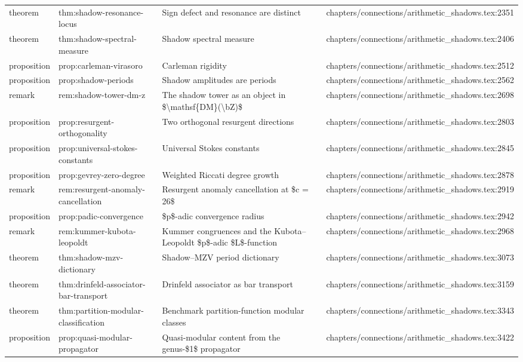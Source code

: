 \documentclass[11pt]{article}
\begin{document}
\begin{longtable}{L{0.10\textwidth}L{0.26\textwidth}L{0.42\textwidth}L{0.22\textwidth}}
theorem & thm:shadow-resonance-locus & Sign defect and resonance are distinct & chapters/connections/arithmetic\_shadows.tex:2351\\
theorem & thm:shadow-spectral-measure & Shadow spectral measure & chapters/connections/arithmetic\_shadows.tex:2406\\
proposition & prop:carleman-virasoro & Carleman rigidity & chapters/connections/arithmetic\_shadows.tex:2512\\
proposition & prop:shadow-periods & Shadow amplitudes are periods & chapters/connections/arithmetic\_shadows.tex:2562\\
remark & rem:shadow-tower-dm-z & The shadow tower as an object in \$\textbackslash{}mathsf\{DM\}(\textbackslash{}bZ)\$ & chapters/connections/arithmetic\_shadows.tex:2698\\
proposition & prop:resurgent-orthogonality & Two orthogonal resurgent directions & chapters/connections/arithmetic\_shadows.tex:2803\\
proposition & prop:universal-stokes-constants & Universal Stokes constants & chapters/connections/arithmetic\_shadows.tex:2845\\
proposition & prop:gevrey-zero-degree & Weighted Riccati degree growth & chapters/connections/arithmetic\_shadows.tex:2878\\
remark & rem:resurgent-anomaly-cancellation & Resurgent anomaly cancellation at \$c = 26\$ & chapters/connections/arithmetic\_shadows.tex:2919\\
proposition & prop:padic-convergence & \$p\$-adic convergence radius & chapters/connections/arithmetic\_shadows.tex:2942\\
remark & rem:kummer-kubota-leopoldt & Kummer congruences and the Kubota--Leopoldt \$p\$-adic \$L\$-function & chapters/connections/arithmetic\_shadows.tex:2968\\
theorem & thm:shadow-mzv-dictionary & Shadow--MZV period dictionary & chapters/connections/arithmetic\_shadows.tex:3073\\
theorem & thm:drinfeld-associator-bar-transport & Drinfeld associator as bar transport & chapters/connections/arithmetic\_shadows.tex:3159\\
theorem & thm:partition-modular-classification & Benchmark partition-function modular classes & chapters/connections/arithmetic\_shadows.tex:3343\\
proposition & prop:quasi-modular-propagator & Quasi-modular content from the genus-\$1\$ propagator & chapters/connections/arithmetic\_shadows.tex:3422\\

\end{longtable}
\end{document}

